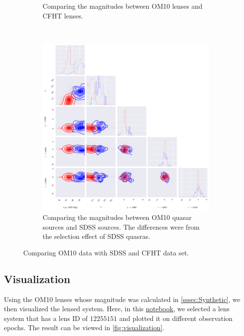 \documentclass[\docopts]{\docclass}
\begin{document}
\begin{figure}
\begin{subfigure}[b]{0.3\textwidth}
        \caption{Comparing the magnitudes between OM10 lenses and CFHT lenses.}
        \label{fig:lens_cfht}
    \end{subfigure}
    ~ %
    \begin{subfigure}[b]{0.3\textwidth}
        \includegraphics[width=\textwidth]{quasar_sdss.png}
        \caption{Comparing the magnitudes between OM10 quasar sources and SDSS sources. The differences were from the selection effect of SDSS quasras.}
        \label{fig:quasar_sdss}
    \end{subfigure}
    \caption{Comparing OM10 data with SDSS and CFHT data set. }\label{fig:comparison}
\end{figure}

\subsection{Visualization}

Using the OM10 lenses whose magnitude was calculated in
\ref{sssec:Synthetic}, we then visualized the lensed system. Here, in this \href{https://github.com/drphilmarshall/OM10/blob/master/notebooks/Color%20Comparison.ipynb}{notebook}, we selected a lens system that has a lens ID of $12255151$ and plotted it on different observation epochs. The result can be viewed in \ref{fig:visualization}.
\end{document}
